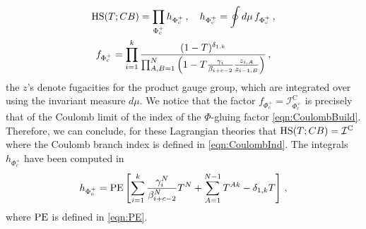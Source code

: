 \documentclass[main.tex]{subfiles}
\begin{document}
\begin{gather}
\textrm{HS}(T;CB)=\prod_{\Phi^+_c}h_{\Phi^+_c}\,,\quad h_{\Phi^+_c}=\oint d\mu\,f_{\Phi^+_c}\,,\\ f_{\Phi^+_{c}}=\prod_{i=1}^k\frac{(1-T)^{\delta_{1,k}}}{\prod_{A,B=1}^N\left(1-T\frac{\gamma_i}{\beta_{i+c-2}}\frac{z_{i,A}}{z_{i-1,B}}\right)}\,,
\end{gather} 
the $z$'s denote fugacities for the product gauge group, which are integrated over using the invariant measure $d\mu$.
We notice that the factor $f_{\Phi^+_c}=\mathcal{I}^{\text{C}}_{\Phi_c^+}$ is precisely that of the Coulomb limit of the index of the $\Phi$-gluing factor \eqref{eqn:CoulombBuild}. Therefore, we can conclude, for these Lagrangian theories that $\textrm{HS}(T;CB)=\mathcal{I}^{\text{C}}$ where the Coulomb branch index is defined in \eqref{eqn:CoulombInd}. The integrals $h_{\Phi_c^+}$ have been computed in \cite{Razamat:2018zus}
\begin{equation}\label{eqn:hscbhfn}
h_{\Phi^+_c}=\operatorname{\mathrm{PE}}\left[\sum_{i=1}^k\frac{\gamma^N_i}{\beta^N_{i+c-2}}T^N+\sum_{A=1}^{N-1}T^{Ak}-\delta_{1,k}T\right]\,,
\end{equation}
where $\operatorname{\mathrm{PE}}$ is defined in \eqref{eqn:PE}.
\end{document}

